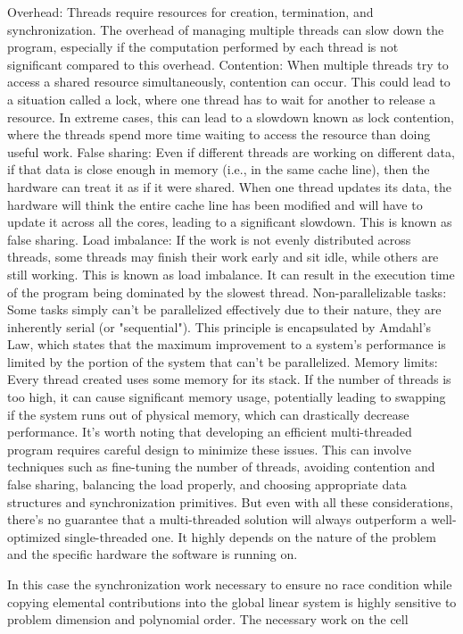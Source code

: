Overhead: Threads require resources for creation, termination, and synchronization. The overhead of managing multiple threads can slow down the program, especially if the computation performed by each thread is not significant compared to this overhead.
Contention: When multiple threads try to access a shared resource simultaneously, contention can occur. This could lead to a situation called a lock, where one thread has to wait for another to release a resource. In extreme cases, this can lead to a slowdown known as lock contention, where the threads spend more time waiting to access the resource than doing useful work.
False sharing: Even if different threads are working on different data, if that data is close enough in memory (i.e., in the same cache line), then the hardware can treat it as if it were shared. When one thread updates its data, the hardware will think the entire cache line has been modified and will have to update it across all the cores, leading to a significant slowdown. This is known as false sharing.
Load imbalance: If the work is not evenly distributed across threads, some threads may finish their work early and sit idle, while others are still working. This is known as load imbalance. It can result in the execution time of the program being dominated by the slowest thread.
Non-parallelizable tasks: Some tasks simply can't be parallelized effectively due to their nature, they are inherently serial (or "sequential"). This principle is encapsulated by Amdahl's Law, which states that the maximum improvement to a system's performance is limited by the portion of the system that can't be parallelized.
Memory limits: Every thread created uses some memory for its stack. If the number of threads is too high, it can cause significant memory usage, potentially leading to swapping if the system runs out of physical memory, which can drastically decrease performance.
It's worth noting that developing an efficient multi-threaded program requires careful design to minimize these issues. This can involve techniques such as fine-tuning the number of threads, avoiding contention and false sharing, balancing the load properly, and choosing appropriate data structures and synchronization primitives. But even with all these considerations, there's no guarantee that a multi-threaded solution will always outperform a well-optimized single-threaded one. It highly depends on the nature of the problem and the specific hardware the software is running on.

In this case the synchronization work necessary to ensure no race condition while copying elemental contributions into the global linear system is highly sensitive to problem dimension and polynomial order.
The necessary work on the cell 

